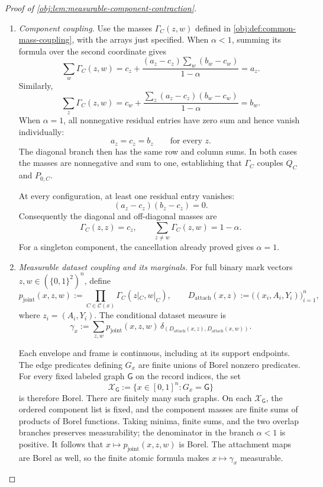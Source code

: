 \documentclass[11pt]{article}
\begin{document}
\begin{proof}[Proof of \cref{obj:lem:measurable-component-contraction}]
\begin{enumerate}
\item \textit{Component coupling.}
Use the masses \(\Gamma_C(z,w)\) defined in
\cref{obj:def:common-mass-coupling}, with the arrays just specified. When \(\alpha<1\), summing its formula over the second coordinate gives
\[
\sum_w\Gamma_C(z,w)
=
c_z+\frac{(a_z-c_z)\sum_w(b_w-c_w)}{1-\alpha}
=a_z.
\]
Similarly,
\[
\sum_z\Gamma_C(z,w)
=
c_w+\frac{\sum_z(a_z-c_z)(b_w-c_w)}{1-\alpha}
=b_w.
\]
When \(\alpha=1\), all nonnegative residual entries have zero sum and hence vanish individually:
\[
a_z=c_z=b_z
\qquad\text{for every }z.
\]
The diagonal branch then has the same row and column sums. In both cases the masses are nonnegative and sum to one, establishing that \(\Gamma_C\) couples \(Q_C\) and \(P_{0,C}\).

At every configuration, at least one residual entry vanishes:
\[
(a_z-c_z)(b_z-c_z)=0.
\]
Consequently the diagonal and off-diagonal masses are
\[
\Gamma_C(z,z)=c_z,
\qquad
\sum_{z\ne w}\Gamma_C(z,w)=1-\alpha.
\]
For a singleton component, the cancellation already proved gives \(\alpha=1\).

\item \textit{Measurable dataset coupling and its marginals.}
For full binary mark vectors \(z,w\in(\{0,1\}^2)^n\), define
\[
p_{\mathrm{joint}}(x,z,w)
:=
\prod_{C\in\mathscr C(x)}
 \Gamma_C(z|_C,w|_C),
\qquad
D_{\mathrm{attach}}(x,z)
:=
\bigl((x_i,A_i,Y_i)\bigr)_{i=1}^n,
\]
where \(z_i=(A_i,Y_i)\). The conditional dataset measure is
\[
\gamma_x
:=
\sum_{z,w}p_{\mathrm{joint}}(x,z,w)\,
\delta_{\left(D_{\mathrm{attach}}(x,z),
               D_{\mathrm{attach}}(x,w)\right)}.
\]

Each envelope and frame is continuous, including at its support endpoints. The edge predicates defining \(G_x\) are finite unions of Borel nonzero predicates. For every fixed labeled graph \(\mathsf G\) on the record indices, the set
\[
\mathcal X_{\mathsf G}:=\{x\in[0,1]^n:G_x=\mathsf G\}
\]
is therefore Borel. There are finitely many such graphs. On each \(\mathcal X_{\mathsf G}\), the ordered component list is fixed, and the component masses are finite sums of products of Borel functions. Taking minima, finite sums, and the two overlap branches preserves measurability; the denominator in the branch \(\alpha<1\) is positive. It follows that \(x\mapsto p_{\mathrm{joint}}(x,z,w)\) is Borel. The attachment maps are Borel as well, so the finite atomic formula makes \(x\mapsto\gamma_x\) measurable.


\end{enumerate}
\end{proof}
\end{document}
